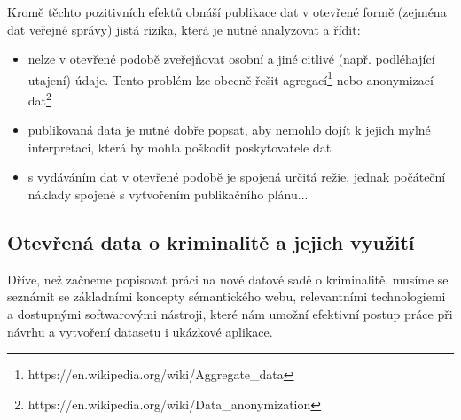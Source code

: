 Kromě těchto pozitivních efektů obnáší publikace dat v otevřené formě (zejména dat veřejné správy) jistá rizika, která je nutné analyzovat a řídit:
\begin{itemize}
	\item nelze v otevřené podobě zveřejňovat osobní a jiné citlivé (např. podléhající utajení) údaje. Tento problém lze obecně řešit agregací\footnote{https://en.wikipedia.org/wiki/Aggregate\_data} nebo anonymizací dat\footnote{https://en.wikipedia.org/wiki/Data\_anonymization}
	\item publikovaná data je nutné dobře popsat, aby nemohlo dojít k jejich mylné interpretaci, která by mohla poškodit poskytovatele dat
	\item s vydáváním dat v otevřené podobě je spojená určitá režie, jednak počáteční náklady spojené s vytvořením publikačního plánu...
\end{itemize}

\subsection{Otevřená data o kriminalitě a jejich využití}

Dříve, než začneme popisovat práci na nové datové sadě o kriminalitě, musíme se seznámit se základními koncepty sémantického webu, relevantními technologiemi a dostupnými softwarovými nástroji, které nám umožní efektivní postup práce při návrhu a vytvoření datasetu i ukázkové aplikace.